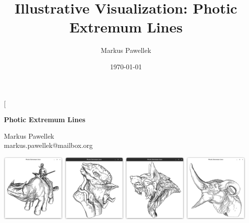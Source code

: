 \documentclass[9pt,fleqn,twoside,twocolumn]{stdglobal}
\title{%
  Illustrative Visualization: Photic Extremum Lines
}
\author{Markus Pawellek}
\date{\today}
\begin{document}
\thispagestyle{sectionstyle}

\twocolumn[{\begin{@twocolumnfalse}%
  \begin{center}
    \Large
    \bfseries
    Photic Extremum Lines
  \end{center}%
  \vspace{1pt}
  \begin{center}
    Markus Pawellek \\
    markus.pawellek@mailbox.org
  \end{center}
  \vspace{1em}
  \begin{center}
    \includegraphics[width=0.24\textwidth,trim={15px 15 15 50},clip]{images/rider.png}
    \hfill
    \includegraphics[width=0.24\textwidth,trim={15px 15 15 50},clip]{images/predator-intro.png}
    \hfill
    \includegraphics[width=0.24\textwidth,trim={15px 15 15 50},clip]{images/werewolf-intro.png}
    \hfill
    \includegraphics[width=0.24\textwidth,trim={15px 15 15 50},clip]{images/dragon-head-contour-pel-toon-shader.png}

\end{center}
\end{@twocolumnfalse}}
\end{document}
